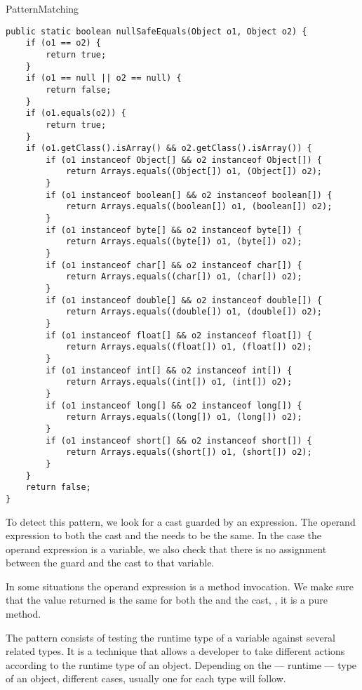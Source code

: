 \begin{pattern}{PatternMatching}
\begin{verbatim}
public static boolean nullSafeEquals(Object o1, Object o2) {
	if (o1 == o2) {
		return true;
	}
	if (o1 == null || o2 == null) {
		return false;
	}
	if (o1.equals(o2)) {
		return true;
	}
	if (o1.getClass().isArray() && o2.getClass().isArray()) {
		if (o1 instanceof Object[] && o2 instanceof Object[]) {
			return Arrays.equals((Object[]) o1, (Object[]) o2);
		}
		if (o1 instanceof boolean[] && o2 instanceof boolean[]) {
			return Arrays.equals((boolean[]) o1, (boolean[]) o2);
		}
		if (o1 instanceof byte[] && o2 instanceof byte[]) {
			return Arrays.equals((byte[]) o1, (byte[]) o2);
		}
		if (o1 instanceof char[] && o2 instanceof char[]) {
			return Arrays.equals((char[]) o1, (char[]) o2);
		}
		if (o1 instanceof double[] && o2 instanceof double[]) {
			return Arrays.equals((double[]) o1, (double[]) o2);
		}
		if (o1 instanceof float[] && o2 instanceof float[]) {
			return Arrays.equals((float[]) o1, (float[]) o2);
		}
		if (o1 instanceof int[] && o2 instanceof int[]) {
			return Arrays.equals((int[]) o1, (int[]) o2);
		}
		if (o1 instanceof long[] && o2 instanceof long[]) {
			return Arrays.equals((long[]) o1, (long[]) o2);
		}
		if (o1 instanceof short[] && o2 instanceof short[]) {
			return Arrays.equals((short[]) o1, (short[]) o2);
		}
	}
	return false;
}
\end{verbatim}

\detection{}
To detect this pattern, we look for a cast guarded by an  expression.
The operand expression to both the cast and the  needs to be the same.
In the case the operand expression is a variable, we also check that there is no assignment between the  guard and the cast to that variable.

In some situations the operand expression is a method invocation.
We make sure that the value returned is the same for both the  and the cast, \ie, it is a pure method.

\discussion{}
The \thisp{} pattern consists of testing the runtime type of a variable against several related types.
It is a technique that allows a developer to take different actions according to the runtime type of an object.
Depending on the --- runtime --- type of an object, different cases, usually one for each type will follow.


\end{pattern}
